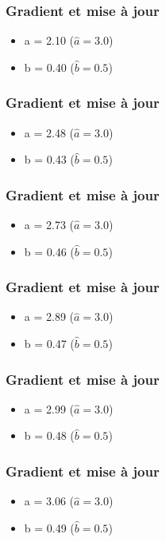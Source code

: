 \documentclass{formation}
\begin{document}
\begin{frame}
  \frametitle{Gradient et mise à jour}
  \begin{itemize}
  \item a = 2.10 ($\hat{a} = 3.0$)
  \item b = 0.40 ($\hat{b} = 0.5$)
  \end{itemize}
\end{frame}

\begin{frame}
  \frametitle{Gradient et mise à jour}
  \begin{itemize}
  \item a = 2.48 ($\hat{a} = 3.0$)
  \item b = 0.43 ($\hat{b} = 0.5$)
  \end{itemize}
\end{frame}

\begin{frame}
  \frametitle{Gradient et mise à jour}
  \begin{itemize}
  \item a = 2.73 ($\hat{a} = 3.0$)
  \item b = 0.46 ($\hat{b} = 0.5$)
  \end{itemize}
\end{frame}

\begin{frame}
  \frametitle{Gradient et mise à jour}
  \begin{itemize}
  \item a = 2.89 ($\hat{a} = 3.0$)
  \item b = 0.47 ($\hat{b} = 0.5$)
  \end{itemize}
\end{frame}

\begin{frame}
  \frametitle{Gradient et mise à jour}
  \begin{itemize}
  \item a = 2.99 ($\hat{a} = 3.0$)
  \item b = 0.48 ($\hat{b} = 0.5$)
  \end{itemize}
\end{frame}

\begin{frame}
  \frametitle{Gradient et mise à jour}
  \begin{itemize}
  \item a = 3.06 ($\hat{a} = 3.0$)
  \item b = 0.49 ($\hat{b} = 0.5$)
  \end{itemize}
\end{frame}
\end{document}
